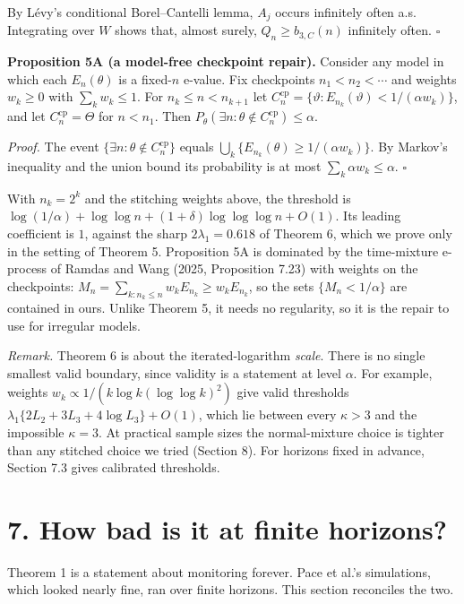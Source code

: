 \documentclass[
  10pt,
  a4paper,
]{article}
\begin{document}
By Lévy's conditional Borel--Cantelli lemma, \(A_j\) occurs infinitely
often a.s. Integrating over \(W\) shows that, almost surely,
\(Q_n\ge b_{3,C}(n)\) infinitely often. \(\square\)

\textbf{Proposition 5A (a model-free checkpoint repair).} Consider any
model in which each \(E_n(\theta)\) is a fixed-\(n\) e-value. Fix
checkpoints \(n_1<n_2<\cdots\) and weights \(w_k\ge0\) with
\(\sum_kw_k\le1\). For \(n_k\le n<n_{k+1}\) let
\(C^{\mathrm{cp}}_n=\{\vartheta:E_{n_k}(\vartheta)<1/(\alpha w_k)\}\),
and let \(C^{\mathrm{cp}}_n=\Theta\) for \(n<n_1\). Then
\(P_\theta(\exists n:\theta\notin C^{\mathrm{cp}}_n)\le\alpha\).

\emph{Proof.} The event \(\{\exists n:\theta\notin C^{\mathrm{cp}}_n\}\)
equals \(\bigcup_k\{E_{n_k}(\theta)\ge1/(\alpha w_k)\}\). By Markov's
inequality and the union bound its probability is at most
\(\sum_k\alpha w_k\le\alpha\). \(\square\)

With \(n_k=2^k\) and the stitching weights above, the threshold is
\(\log(1/\alpha)+\log\log n+(1+\delta)\log\log\log n+O(1)\). Its leading
coefficient is \(1\), against the sharp \(2\lambda_1=0.618\) of Theorem
6, which we prove only in the setting of Theorem 5. Proposition 5A is
dominated by the time-mixture e-process of Ramdas and Wang (2025,
Proposition 7.23) with weights on the checkpoints:
\(M_n=\sum_{k:n_k\le n}w_kE_{n_k}\ge w_kE_{n_k}\), so the sets
\(\{M_n<1/\alpha\}\) are contained in ours. Unlike Theorem 5, it needs
no regularity, so it is the repair to use for irregular models.

\emph{Remark.} Theorem 6 is about the iterated-logarithm \emph{scale}.
There is no single smallest valid boundary, since validity is a
statement at level \(\alpha\). For example, weights
\(w_k\propto1/(k\log k(\log\log k)^2)\) give valid thresholds
\(\lambda_1\{2L_2+3L_3+4\log L_3\}+O(1)\), which lie between every
\(\kappa>3\) and the impossible \(\kappa=3\). At practical sample sizes
the normal-mixture choice is tighter than any stitched choice we tried
(Section 8). For horizons fixed in advance, Section 7.3 gives calibrated
thresholds.

\section{7. How bad is it at finite
horizons?}\label{how-bad-is-it-at-finite-horizons}

Theorem 1 is a statement about monitoring forever. Pace et al.'s
simulations, which looked nearly fine, ran over finite horizons. This
section reconciles the two.
\end{document}
